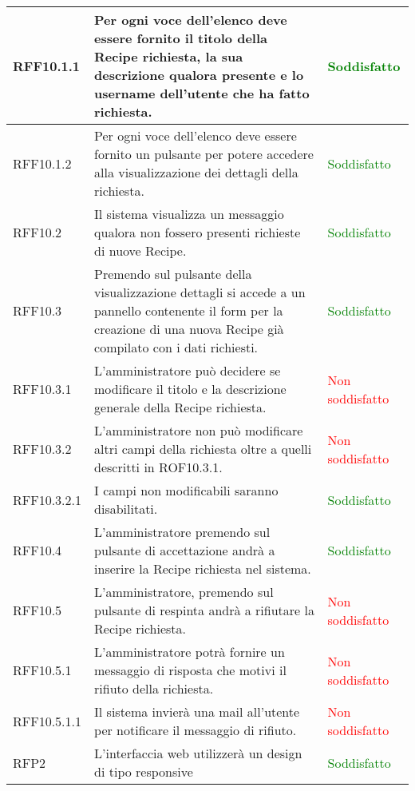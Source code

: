 \begin{center}
\begin{longtable}{| p{2.5cm} | p{8cm} | p{3.5cm} |}
		\hline
		RFF10.1.1  &  Per ogni voce dell'elenco deve essere fornito il titolo della Recipe richiesta, la sua descrizione qualora presente e lo username dell'utente che ha fatto richiesta.  & \textcolor{green}{Soddisfatto} \\
		\hline
		RFF10.1.2  &  Per ogni voce dell'elenco deve essere fornito un pulsante per potere accedere alla visualizzazione dei dettagli della richiesta.  & \textcolor{green}{Soddisfatto} \\
		\hline
		RFF10.2  &  Il sistema visualizza un messaggio qualora non fossero presenti richieste di nuove Recipe.  & \textcolor{green}{Soddisfatto} \\
		\hline
		RFF10.3  &  Premendo sul pulsante della visualizzazione dettagli si accede a un pannello contenente il form per la creazione di una nuova Recipe già compilato con i dati richiesti.  &  \textcolor{green}{Soddisfatto} \\
		\hline
		RFF10.3.1  &  L'amministratore può decidere se modificare il titolo e la descrizione generale della Recipe richiesta.  & \textcolor{red}{ Non soddisfatto} \\
		\hline
		RFF10.3.2  &  L'amministratore non può modificare altri campi della richiesta oltre a quelli descritti in ROF10.3.1.  & \textcolor{red}{ Non soddisfatto} \\
		\hline
		RFF10.3.2.1  &  I campi non modificabili saranno disabilitati.  & \textcolor{green}{Soddisfatto} \\
		\hline
		RFF10.4  &  L'amministratore premendo sul pulsante di accettazione andrà a inserire la Recipe richiesta nel sistema.  & \textcolor{green}{Soddisfatto} \\
		\hline
		RFF10.5  &  L'amministratore, premendo sul pulsante di respinta andrà a rifiutare la Recipe richiesta.  & \textcolor{red}{ Non soddisfatto} \\
		\hline
		RFF10.5.1  &  L'amministratore potrà fornire un messaggio di risposta che motivi il rifiuto della richiesta.  & \textcolor{red}{ Non soddisfatto} \\
		\hline
		RFF10.5.1.1  &  Il sistema invierà una mail all'utente per notificare il messaggio di rifiuto.  &  \textcolor{red}{ Non soddisfatto} \\
		\hline
		RFP2  &  L'interfaccia web utilizzerà un design di tipo responsive  &  \textcolor{green}{Soddisfatto} \\
		\hline
	\end{longtable}
	\egroup
\end{center}

